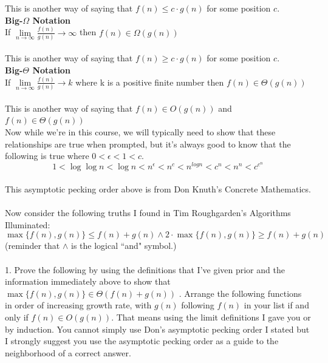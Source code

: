 \documentclass[12pt]{article}
\begin{document}
This is another way of saying that $f(n) \leq c \cdot g(n)$ for some position $c$.\\
\textbf{Big-$\Omega$ Notation}\\
If $\lim\limits_{n\to\infty}{\frac{f(n)}{g(n)}}\to\infty$ then $f(n) \in \Omega(g(n))$\\\\
This is another way of saying that $f(n) \geq c \cdot g(n)$ for some position $c$.\\
\textbf{Big-$\Theta$ Notation}\\
If $\lim\limits_{n\to\infty}{\frac{f(n)}{g(n)}}\to k$ where k is a positive finite number then $f(n) \in \Theta(g(n))$\\\\
This is another way of saying that $f(n) \in O(g(n))$ and $f(n) \in \Theta(g(n))$\.\\
Now while we're in this course, we will typically need to show that these relationships are true when prompted, but it's always good to know that the following is true where \begin{math}0 < \epsilon < 1 < c\end{math}.\\
\[1 < \log{\log{n}} < \log{n} < n^{\epsilon} < n^c < n^{log{n}} < c^n < n^n < c^{c^{n}}\]\\
This asymptotic pecking order above is from Don Knuth's Concrete Mathematics.\\\\
\newpage
Now consider the following truths I found in Tim Roughgarden's Algorithms Illuminated: \\
$$\max\{f(n),g(n)\} \leq f(n) + g(n) \land  2 \cdot \max\{f(n),g(n)\} \geq f(n) + g(n)$$
(reminder that $\land$ is the logical ``and" symbol.)\\\\
1. Prove the following  by using the definitions that I've given prior and the information immediately above to show that $\max\{f(n),g(n)\}\in\Theta(f(n) + g(n))$
\newpage
{}. Arrange the following functions in order of increasing growth rate, with $g(n)$ following $f(n)$ in your list if and only if $f(n) \in O(g(n))$. That means using the limit definitions I gave you or by induction. You cannot simply use Don's asymptotic pecking order I stated but I strongly suggest you use the asymptotic pecking order as a guide to the neighborhood of a correct answer.\\
\end{document}
